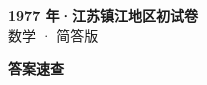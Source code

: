 \documentclass[zihao=-4, a4paper]{ctexart}
\begin{document}
\begin{center}
  {\Large\bfseries 1977 年·江苏镇江地区初试卷}\\[4pt]
  {\large 数学 · 简答版}
\end{center}
\medskip
{}

\clearpage
{}
\begin{center}{\Large\bfseries 答案速查}\end{center}
\medskip

\end{document}
